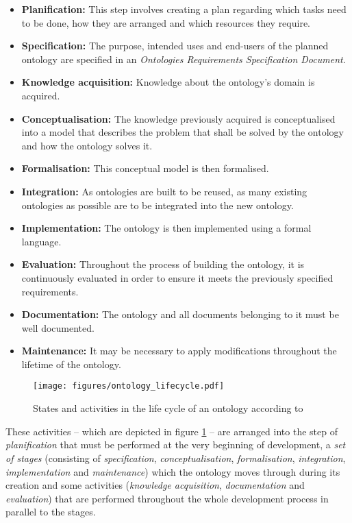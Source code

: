 \begin{itemize}
  \item \textbf{Planification:} This step involves creating a plan regarding which tasks need to be done, how they are arranged and which resources they require.
  \item \textbf{Specification:} The purpose, intended uses and end-users of the planned ontology are specified in an \emph{Ontologies Requirements Specification Document}.
  \item \textbf{Knowledge acquisition:} Knowledge about the ontology's domain is acquired.
  \item \textbf{Conceptualisation:} The knowledge previously acquired is conceptualised into a model that describes the problem that shall be solved by the ontology and how the ontology solves it.
  \item \textbf{Formalisation:} This conceptual model is then formalised.
  \item \textbf{Integration:} As ontologies are built to be reused, as many existing ontologies as possible are to be integrated into the new ontology.
  \item \textbf{Implementation:} The ontology is then implemented using a formal language.
  \item \textbf{Evaluation:} Throughout the process of building the ontology, it is continuously evaluated in order to ensure it meets the previously specified requirements.
  \item \textbf{Documentation:} The ontology and all documents belonging to it must be well documented.
  \item \textbf{Maintenance:} It may be necessary to apply modifications throughout the lifetime of the ontology.
\end{itemize}

\begin{figure}
  \texttt{[image: figures/ontology\_lifecycle.pdf]}
  \caption{States and activities in the life cycle of an ontology according to \methontology \cite{Methontology}}
  \label{fig:methontology1}
\end{figure}

These activities -- which are depicted in figure \ref{fig:methontology1} -- are arranged into the step of \emph{planification} that must be performed at the very beginning of development, a \emph{set of stages} (consisting of \emph{specification}, \emph{conceptualisation}, \emph{formalisation}, \emph{integration}, \emph{implementation} and \emph{maintenance}) which the ontology moves through during its creation and some activities (\emph{knowledge acquisition}, \emph{documentation} and \emph{evaluation}) that are performed throughout the whole development process in parallel to the stages.

